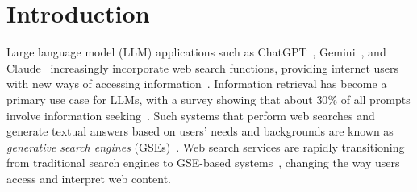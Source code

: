 \section{Introduction}\label{sec:introduction}
Large language model (LLM) applications such as ChatGPT~\cite{chatgpt}, Gemini~\cite{gemini}, and Claude~\cite{claude} increasingly incorporate web search functions, providing internet users with new ways of accessing information~\cite{webgpt-arxiv21, geo-apmr+24, zhai2024llm-and-future-of-information-retrieval}. 
Information retrieval has become a primary use case for LLMs, with a survey showing that about $30\%$ of all prompts involve information seeking~\cite{how-people-use-chatgpt-nber25}. 
Such systems that perform web searches and generate textual answers based on users' needs and backgrounds are known as \emph{generative search engines} (GSEs)~\cite{geo-apmr+24}. 
Web search services are rapidly transitioning from traditional search engines to GSE-based systems~\cite{openai-chatgpt-search24, google-gemini-search24, perplexity-comet25, dia-browser25, microsoft-bing-chat23, anthropic-multiagent25}, changing the way users access and interpret web content.



